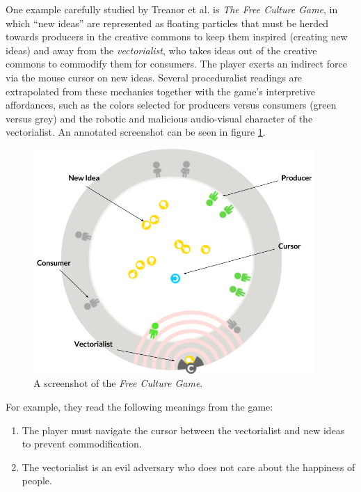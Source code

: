 \documentclass[a4paper]{article}
\begin{document}
One example carefully studied by Treanor et al. is {\em The Free Culture
Game}, in which ``new ideas'' are represented as floating particles that
must be herded towards producers in the creative commons to keep them
inspired (creating new ideas) and away from the {\em vectorialist}, who
takes ideas out of the creative commons to commodify them for consumers.
The player exerts an indirect force via the mouse cursor on new ideas.
Several proceduralist readings are extrapolated from these mechanics
together with the game's interpretive affordances, such as the colors
selected for producers versus consumers (green versus grey) and the robotic
and malicious audio-visual character of the vectorialist. An annotated screenshot can be seen in figure \ref{fig:fcg_screenshot}.  

\begin{figure}[ht]
\centering
\includegraphics[width=0.95\textwidth]{figures/Free_Culture.png}
\caption{A screenshot of the \textit{Free Culture Game}.}
\label{fig:fcg_screenshot}
\end{figure}

For example, they
read the following meanings from the game:

\begin{enumerate}
\item The player must navigate the cursor between the
  vectorialist and new ideas to prevent commodification.
\item The vectorialist is an evil adversary who does not care
  about the happiness of people.
\end{enumerate}
\end{document}
